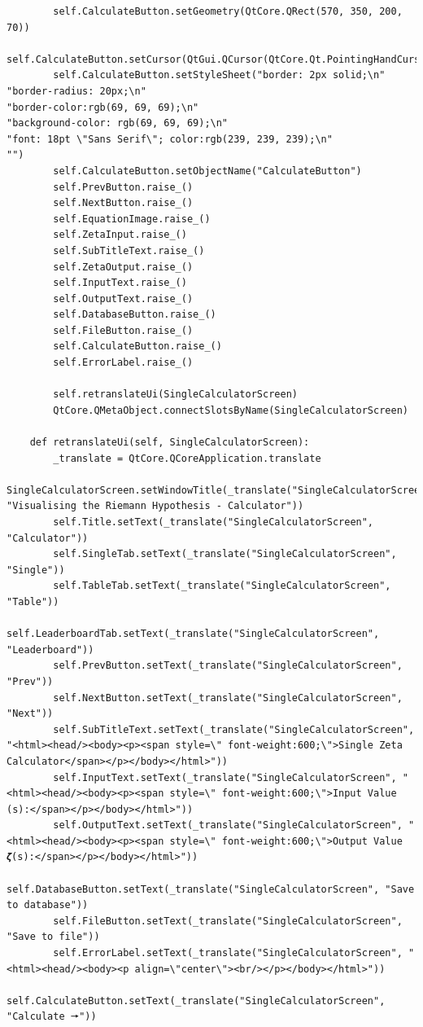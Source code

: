 \documentclass{article}
\begin{document}
\begin{lstlisting}
        self.CalculateButton.setGeometry(QtCore.QRect(570, 350, 200, 70))
        self.CalculateButton.setCursor(QtGui.QCursor(QtCore.Qt.PointingHandCursor))
        self.CalculateButton.setStyleSheet("border: 2px solid;\n"
"border-radius: 20px;\n"
"border-color:rgb(69, 69, 69);\n"
"background-color: rgb(69, 69, 69);\n"
"font: 18pt \"Sans Serif\"; color:rgb(239, 239, 239);\n"
"")
        self.CalculateButton.setObjectName("CalculateButton")
        self.PrevButton.raise_()
        self.NextButton.raise_()
        self.EquationImage.raise_()
        self.ZetaInput.raise_()
        self.SubTitleText.raise_()
        self.ZetaOutput.raise_()
        self.InputText.raise_()
        self.OutputText.raise_()
        self.DatabaseButton.raise_()
        self.FileButton.raise_()
        self.CalculateButton.raise_()
        self.ErrorLabel.raise_()

        self.retranslateUi(SingleCalculatorScreen)
        QtCore.QMetaObject.connectSlotsByName(SingleCalculatorScreen)

    def retranslateUi(self, SingleCalculatorScreen):
        _translate = QtCore.QCoreApplication.translate
        SingleCalculatorScreen.setWindowTitle(_translate("SingleCalculatorScreen", "Visualising the Riemann Hypothesis - Calculator"))
        self.Title.setText(_translate("SingleCalculatorScreen", "Calculator"))
        self.SingleTab.setText(_translate("SingleCalculatorScreen", "Single"))
        self.TableTab.setText(_translate("SingleCalculatorScreen", "Table"))
        self.LeaderboardTab.setText(_translate("SingleCalculatorScreen", "Leaderboard"))
        self.PrevButton.setText(_translate("SingleCalculatorScreen", "Prev"))
        self.NextButton.setText(_translate("SingleCalculatorScreen", "Next"))
        self.SubTitleText.setText(_translate("SingleCalculatorScreen", "<html><head/><body><p><span style=\" font-weight:600;\">Single Zeta Calculator</span></p></body></html>"))
        self.InputText.setText(_translate("SingleCalculatorScreen", "<html><head/><body><p><span style=\" font-weight:600;\">Input Value (s):</span></p></body></html>"))
        self.OutputText.setText(_translate("SingleCalculatorScreen", "<html><head/><body><p><span style=\" font-weight:600;\">Output Value 𝜻(s):</span></p></body></html>"))
        self.DatabaseButton.setText(_translate("SingleCalculatorScreen", "Save to database"))
        self.FileButton.setText(_translate("SingleCalculatorScreen", "Save to file"))
        self.ErrorLabel.setText(_translate("SingleCalculatorScreen", "<html><head/><body><p align=\"center\"><br/></p></body></html>"))
        self.CalculateButton.setText(_translate("SingleCalculatorScreen", "Calculate 🠖"))
\end{lstlisting}
\end{document}
